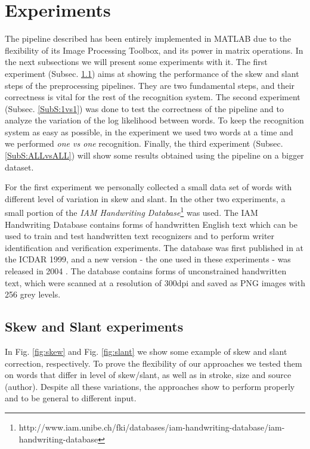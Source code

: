 \documentclass[conference]{IEEEtran}
\begin{document}
\section{Experiments} \label{experiments}
The pipeline described has been entirely implemented in MATLAB due to the flexibility of its Image Processing Toolbox, and its power in matrix operations. In the next subsections we will present some experiments with it. The first experiment (Subsec. \ref{SubS:SS}) aims at showing the performance of the skew and slant steps of the preprocessing pipelines. They are two fundamental steps, and their correctness is vital for the rest of the recognition system. The second experiment (Subsec. \ref{SubS:1vs1}) was done to test the correctness of the pipeline and to analyze the variation of the log likelihood between words. To keep the recognition system as easy as possible, in the experiment we used two words at a time and we performed \textit{one vs one} recognition. Finally, the third experiment  (Subsec. \ref{SubS:ALLvsALL}) will show some results obtained using the pipeline on a bigger dataset.

For the first experiment we personally collected a small data set of words with different level of  variation in skew and slant. In the other two experiments, a small portion of the \textit{IAM Handwriting Database}\footnote{http://www.iam.unibe.ch/fki/databases/iam-handwriting-database/iam-handwriting-database} was used. The IAM Handwriting Database contains forms of handwritten English text which can be used to train and test handwritten text recognizers and to perform writer identification and verification experiments. The database was first published in \cite{FullEnglish} at the ICDAR 1999, and a new version - the one used in these experiments - was released in 2004 \cite{marti02iam}. The database contains forms of unconstrained handwritten text, which were scanned at a resolution of 300dpi and saved as PNG images with 256 grey levels. 

\subsection{Skew and Slant experiments} \label{SubS:SS}
In Fig. \ref{fig:skew} and Fig. \ref{fig:slant} we show some example of skew and slant correction, respectively. To prove the flexibility of our approaches we tested them on words that differ in level of skew/slant, as well as in stroke, size and source (author). Despite all these variations, the approaches show to perform properly and to be general to different input.
\end{document}
